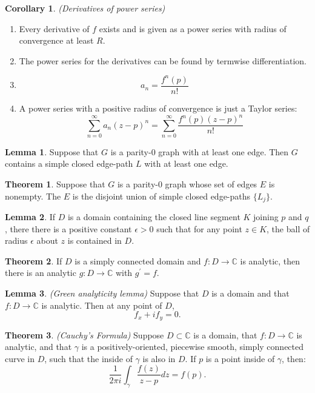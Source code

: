 \documentclass[a4paper]{article}
\theoremstyle{definition}
\newtheorem{theorem}{Theorem}
\newtheorem{lemma}{Lemma}
\newtheorem{corollary}{Corollary}
\begin{document}
	\begin{corollary}
		\emph{(Derivatives of power series)}
		\begin{enumerate}[label=\alph*.]
			\item Every derivative of $f$ exists and is given as a power series with radius of convergence at least $R$.
			\item The power series for the derivatives can be found by termwise differentiation.
			\item $$a_{n} = \frac{f^{n}(p)}{n!}$$
			\item A power series with a positive radius of convergence is just a Taylor series:
			$$\sum_{n=0}^{\infty} a_{n}(z - p)^{n} = \sum_{n=0}^{\infty} \frac{f^{n}(p)(z-p)^{n}}{n!}$$
		\end{enumerate}
	\end{corollary}
	
	\begin{lemma}
		Suppose that $G$ is a parity-0 graph with at least one edge. Then $G$ contains a simple closed edge-path $L$ with at least one edge.
	\end{lemma}
	
	\begin{theorem}
		Suppose that $G$ is a parity-0 graph whose set of edges $E$ is nonempty. The $E$ is the disjoint union of simple closed edge-paths $\{L_{j}\}$.
	\end{theorem}
	
	\begin{lemma}
		If $D$ is a domain containing the closed line segment $K$ joining $p$ and $q$, there there is a positive constant $\epsilon > 0$ such that for any point $z \in K$, the ball of radius $\epsilon$ about $z$ is contained in $D$.
	\end{lemma}
	
	\begin{theorem}
		If $D$ is a simply connected domain and $f : D \rightarrow \mathbb{C}$ is analytic, then there is an analytic $g : D \rightarrow \mathbb{C}$ with $g^{\prime} = f$.
	\end{theorem}
	
	\begin{lemma}
		\emph{(Green analyticity lemma)}
		Suppose that $D$ is a domain and that $f : D \rightarrow \mathbb{C}$ is analytic. Then at any point of $D$,
		$$f_{x} + if_{y} = 0.$$
	\end{lemma}
	
	\begin{theorem}
		\emph{(Cauchy's Formula)}
		Suppose $D \subset \mathbb{C}$ is a domain, that $f : D \rightarrow \mathbb{C}$ is analytic, and that $\gamma$ is a positively-oriented, piecewise smooth, simply connected curve in $D$, such that the inside of $\gamma$ is also in $D$. If $p$ is a point inside of $\gamma$, then:
		$$\frac{1}{2\pi i} \int_{\gamma} \frac{f(z)}{z - p} dz = f(p).$$
	\end{theorem}
	
\end{document}
